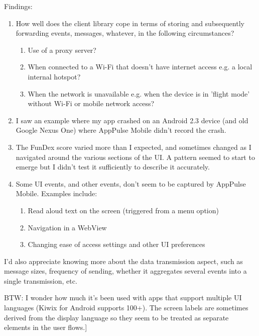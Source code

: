 Findings: 
\begin{enumerate}
    \item How well does the client library cope in terms of storing and subsequently forwarding events, messages, whatever, in the following circumstances?
    \begin{enumerate}
        \item Use of a proxy server?
        \item When connected to a Wi-Fi that doesn't have internet access e.g. a local internal hotspot?
        \item When the network is unavailable e.g. when the device is in 'flight mode' without Wi-Fi or mobile network access?
    \end{enumerate}
    \item I saw an example where my app crashed on an Android 2.3 device (and old Google Nexus One) where AppPulse Mobile didn't record the crash.
    \item The FunDex score varied more than I expected, and sometimes changed as I navigated around the various sections of the UI. A pattern seemed to start to emerge but I didn't test it sufficiently to describe it accurately.
    \item Some UI events, and other events, don't seem to be captured by AppPulse Mobile. Examples include:
    \begin{enumerate}
        \item Read aloud text on the screen (triggered from a menu option)
        \item Navigation in a WebView
        \item Changing ease of access settings and other UI preferences
    \end{enumerate}
\end{enumerate}

I'd also appreciate knowing more about the data transmission aspect, such as message sizes, frequency of sending, whether it aggregates several events into a single transmission, etc.

BTW: I wonder how much it's been used with apps that support multiple UI languages (Kiwix for Android supports 100+). The screen labels are sometimes derived from the display language so they seem to be treated as separate elements in the user flows.]

